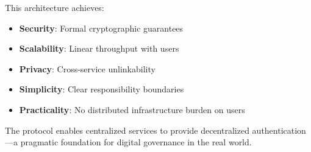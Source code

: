 This architecture achieves:
\begin{itemize}
  \item \textbf{Security}: Formal cryptographic guarantees
  \item \textbf{Scalability}: Linear throughput with users
  \item \textbf{Privacy}: Cross-service unlinkability
  \item \textbf{Simplicity}: Clear responsibility boundaries
  \item \textbf{Practicality}: No distributed infrastructure burden on users
\end{itemize}

The protocol enables centralized services to provide decentralized authentication—a pragmatic foundation for digital governance in the real world.

